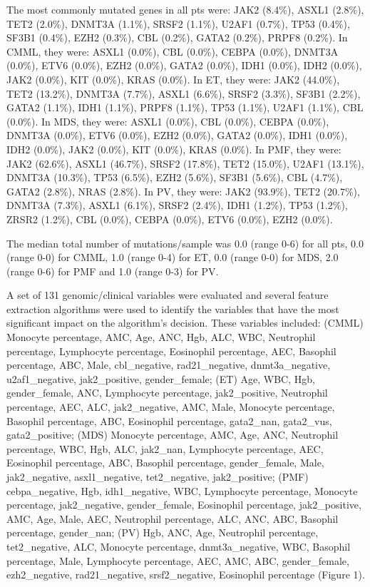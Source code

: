 The most commonly mutated genes in all pts were: JAK2 (8.4\%), ASXL1 (2.8\%), TET2 (2.0\%), DNMT3A (1.1\%), SRSF2 (1.1\%), U2AF1 (0.7\%), TP53 (0.4\%), SF3B1 (0.4\%), EZH2 (0.3\%), CBL (0.2\%), GATA2 (0.2\%), PRPF8 (0.2\%). In CMML, they were: ASXL1 (0.0\%), CBL (0.0\%), CEBPA (0.0\%), DNMT3A (0.0\%), ETV6 (0.0\%), EZH2 (0.0\%), GATA2 (0.0\%), IDH1 (0.0\%), IDH2 (0.0\%), JAK2 (0.0\%), KIT (0.0\%), KRAS (0.0\%). In ET, they were: JAK2 (44.0\%), TET2 (13.2\%), DNMT3A (7.7\%), ASXL1 (6.6\%), SRSF2 (3.3\%), SF3B1 (2.2\%), GATA2 (1.1\%), IDH1 (1.1\%), PRPF8 (1.1\%), TP53 (1.1\%), U2AF1 (1.1\%), CBL (0.0\%). In MDS, they were: ASXL1 (0.0\%), CBL (0.0\%), CEBPA (0.0\%), DNMT3A (0.0\%), ETV6 (0.0\%), EZH2 (0.0\%), GATA2 (0.0\%), IDH1 (0.0\%), IDH2 (0.0\%), JAK2 (0.0\%), KIT (0.0\%), KRAS (0.0\%). In PMF, they were: JAK2 (62.6\%), ASXL1 (46.7\%), SRSF2 (17.8\%), TET2 (15.0\%), U2AF1 (13.1\%), DNMT3A (10.3\%), TP53 (6.5\%), EZH2 (5.6\%), SF3B1 (5.6\%), CBL (4.7\%), GATA2 (2.8\%), NRAS (2.8\%). In PV, they were: JAK2 (93.9\%), TET2 (20.7\%), DNMT3A (7.3\%), ASXL1 (6.1\%), SRSF2 (2.4\%), IDH1 (1.2\%), TP53 (1.2\%), ZRSR2 (1.2\%), CBL (0.0\%), CEBPA (0.0\%), ETV6 (0.0\%), EZH2 (0.0\%).

The median total number of mutations/sample was 0.0 (range 0-6) for all pts, 0.0 (range 0-0) for CMML, 1.0 (range 0-4) for ET, 0.0 (range 0-0) for MDS, 2.0 (range 0-6) for PMF and 1.0 (range 0-3) for PV.


A set of 131 genomic/clinical variables were evaluated and several feature extraction algorithms were used to identify the variables that have the most significant impact on the algorithm's decision. These variables included: (CMML) Monocyte percentage, AMC, Age, ANC, Hgb, ALC, WBC, Neutrophil percentage, Lymphocyte percentage, Eosinophil percentage, AEC, Basophil percentage, ABC, Male, cbl_negative, rad21_negative, dnmt3a_negative, u2af1_negative, jak2_positive, gender_female; (ET) Age, WBC, Hgb, gender_female, ANC, Lymphocyte percentage, jak2_positive, Neutrophil percentage, AEC, ALC, jak2_negative, AMC, Male, Monocyte percentage, Basophil percentage, ABC, Eosinophil percentage, gata2_nan, gata2_vus, gata2_positive; (MDS) Monocyte percentage, AMC, Age, ANC, Neutrophil percentage, WBC, Hgb, ALC, jak2_nan, Lymphocyte percentage, AEC, Eosinophil percentage, ABC, Basophil percentage, gender_female, Male, jak2_negative, asxl1_negative, tet2_negative, jak2_positive; (PMF) cebpa_negative, Hgb, idh1_negative, WBC, Lymphocyte percentage, Monocyte percentage, jak2_negative, gender_female, Eosinophil percentage, jak2_positive, AMC, Age, Male, AEC, Neutrophil percentage, ALC, ANC, ABC, Basophil percentage, gender_nan; (PV) Hgb, ANC, Age, Neutrophil percentage, tet2_negative, ALC, Monocyte percentage, dnmt3a_negative, WBC, Basophil percentage, Male, Lymphocyte percentage, AEC, AMC, ABC, gender_female, ezh2_negative, rad21_negative, srsf2_negative, Eosinophil percentage (Figure 1).

